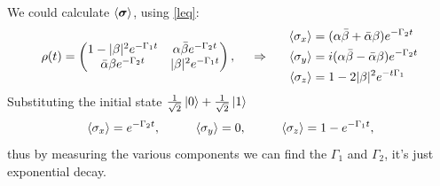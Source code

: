 We could calculate $\langle \boldsymbol{\sigma}\rangle$, using  \eqref{leq}:
\begin{equation*}
	\rho(t) = \begin{pmatrix}
	    1-|\beta|^2 e^{- \Gamma_1 t} & \alpha \bar{\beta} e^{-\Gamma_2 t} \\
	    \bar{\alpha} \beta e^{- \Gamma_2 t} & |\beta|^2 e^{-\Gamma_1 t} \\
	\end{pmatrix},
	\hspace{0.5cm} \Rightarrow \hspace{0.5cm}
	\left.\begin{aligned}
	   \langle \sigma_x\rangle &= (\alpha \bar{\beta} + \bar{\alpha} \beta ) e^{- \Gamma_2 t}\\
	   \langle \sigma_y\rangle &= i(\alpha \bar{\beta} - \bar{\alpha} \beta ) e^{- \Gamma_2 t} \\
	   \langle \sigma_z\rangle &= 1 - 2 |\beta|^2 e^{-t \Gamma_1}
	\end{aligned}\right.
\end{equation*}
Substituting the initial state $\tfrac{1}{\sqrt{2}}\left| 0 \right\rangle + \tfrac{1}{\sqrt{2}}\left| 1 \right\rangle$
\begin{equation*}
	\langle \sigma_x\rangle =  e^{- \Gamma_2 t},
	\hspace{10 mm} 
	\langle \sigma_y\rangle = 0,
	\hspace{10 mm}
	\langle \sigma_z\rangle = 1 - e^{- \Gamma_1 t},
\end{equation*}
thus by measuring the various components we can find the $\Gamma_1$ and $\Gamma_2$, it's just exponential decay.

